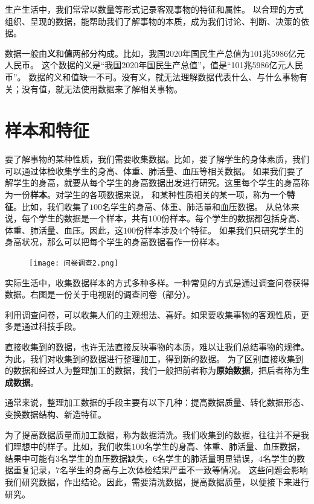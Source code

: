 \documentclass[12pt,UTF8]{ctexbook}
\begin{document}
生产生活中，我们常常以数量等形式记录客观事物的特征和属性。
以合理的方式组织、呈现的数据，能帮助我们了解事物的本质，成为我们讨论、判断、决策的依据。

数据一般由\textbf{义}和\textbf{值}两部分构成。比如，我国2020年国民生产总值为101兆5986亿元人民币。
这个数据的义是“我国2020年国民生产总值”，值是“101兆5986亿元人民币”。
数据的义和值缺一不可。没有义，就无法理解数据代表什么、与什么事物有关；没有值，就无法使用数据来了解相关事物。

\section{样本和特征}
要了解事物的某种性质，我们需要收集数据。比如，要了解学生的身体素质，我们可以通过体检收集学生的身高、体重、肺活量、血压等相关数据。
如果我们要了解学生的身高，就要从每个学生的身高数据出发进行研究。这里每个学生的身高称为一份\textbf{样本}。对学生的各项数据来说，
和某种性质相关的某一项，称为一个\textbf{特征}。比如，我们收集了$100$名学生的身高、体重、肺活量和血压数据。
从总体来说，每个学生的数据是一个样本，共有$100$份样本。每个学生的数据都包括身高、体重、肺活量、血压。因此，这$100$份样本涉及$4$个特征。
如果我们只研究学生的身高状况，那么可以把每个学生的身高数据看作一份样本。


\begin{figure} %
    \vspace{-20pt}
    \flushright
    \texttt{[image: 问卷调查2.png]}
\end{figure}

实际生活中，收集数据样本的方式多种多样。一种常见的方式是通过调查问卷获得数据。右图是一份关于电视剧的调查问卷（部分）。

利用调查问卷，可以收集人们的主观想法、喜好。如果要收集事物的客观性质，更多是通过科技手段。

直接收集到的数据，也许无法直接反映事物的本质，难以让我们总结事物的规律。
为此，我们对收集到的数据进行整理加工，得到新的数据。
为了区别直接收集到的数据和经过人为整理加工的数据，我们一般把前者称为\textbf{原始数据}，把后者称为\textbf{生成数据}。

通常来说，整理加工数据的手段主要有以下几种：提高数据质量、转化数据形态、变换数据结构、新造特征。

为了提高数据质量而加工数据，称为数据清洗。我们收集到的数据，往往并不是我们理想中的样子。比如，我们收集$100$名学生的身高、体重、肺活量、血压数据，
结果中可能有$3$名学生的血压数据缺失，$6$名学生的肺活量明显错误，$4$名学生的数据重复记录，$7$名学生的身高与上次体检结果严重不一致等情况。
这些问题会影响我们研究数据，作出结论。因此，需要清洗数据，提高数据质量，以便接下来进行研究。
\end{document}
